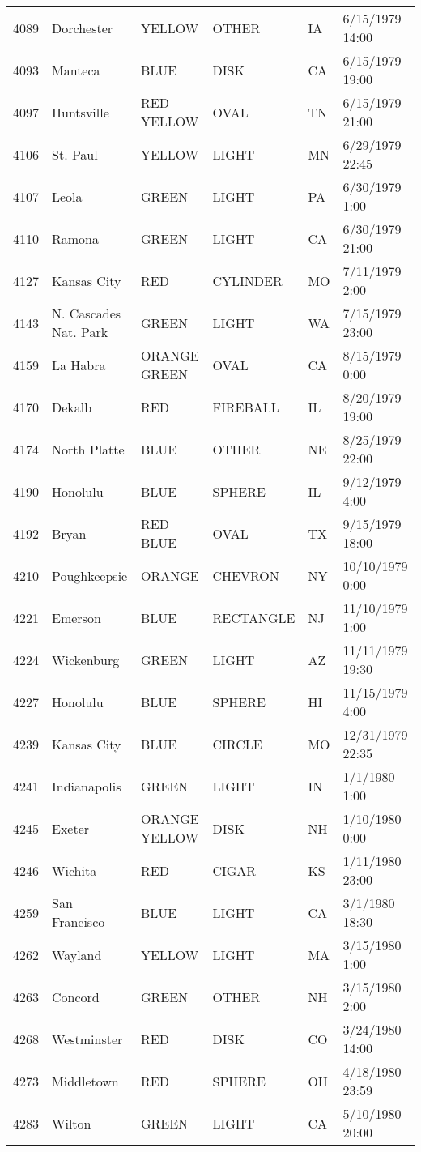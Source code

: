 \begin{tabular}{llllll}
4089 & Dorchester & YELLOW & OTHER & IA & 6/15/1979 14:00 \\
4093 & Manteca & BLUE & DISK & CA & 6/15/1979 19:00 \\
4097 & Huntsville & RED YELLOW & OVAL & TN & 6/15/1979 21:00 \\
4106 & St. Paul & YELLOW & LIGHT & MN & 6/29/1979 22:45 \\
4107 & Leola & GREEN & LIGHT & PA & 6/30/1979 1:00 \\
4110 & Ramona & GREEN & LIGHT & CA & 6/30/1979 21:00 \\
4127 & Kansas City & RED & CYLINDER & MO & 7/11/1979 2:00 \\
4143 & N. Cascades Nat. Park & GREEN & LIGHT & WA & 7/15/1979 23:00 \\
4159 & La Habra & ORANGE GREEN & OVAL & CA & 8/15/1979 0:00 \\
4170 & Dekalb & RED & FIREBALL & IL & 8/20/1979 19:00 \\
4174 & North Platte & BLUE & OTHER & NE & 8/25/1979 22:00 \\
4190 & Honolulu & BLUE & SPHERE & IL & 9/12/1979 4:00 \\
4192 & Bryan & RED BLUE & OVAL & TX & 9/15/1979 18:00 \\
4210 & Poughkeepsie & ORANGE & CHEVRON & NY & 10/10/1979 0:00 \\
4221 & Emerson & BLUE & RECTANGLE & NJ & 11/10/1979 1:00 \\
4224 & Wickenburg & GREEN & LIGHT & AZ & 11/11/1979 19:30 \\
4227 & Honolulu & BLUE & SPHERE & HI & 11/15/1979 4:00 \\
4239 & Kansas City & BLUE & CIRCLE & MO & 12/31/1979 22:35 \\
4241 & Indianapolis & GREEN & LIGHT & IN & 1/1/1980 1:00 \\
4245 & Exeter & ORANGE YELLOW & DISK & NH & 1/10/1980 0:00 \\
4246 & Wichita & RED & CIGAR & KS & 1/11/1980 23:00 \\
4259 & San Francisco & BLUE & LIGHT & CA & 3/1/1980 18:30 \\
4262 & Wayland & YELLOW & LIGHT & MA & 3/15/1980 1:00 \\
4263 & Concord & GREEN & OTHER & NH & 3/15/1980 2:00 \\
4268 & Westminster & RED & DISK & CO & 3/24/1980 14:00 \\
4273 & Middletown & RED & SPHERE & OH & 4/18/1980 23:59 \\
4283 & Wilton & GREEN & LIGHT & CA & 5/10/1980 20:00 \\

\end{tabular}
